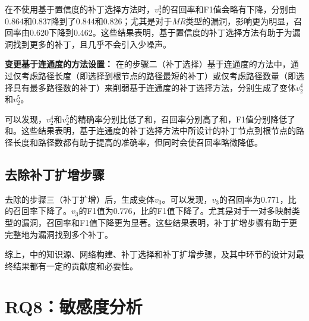 在不使用基于置信度的补丁选择方法时，$v_2^3$的召回率和F1值会略有下降，分别由0.864和0.837降到了0.844和0.826；尤其是对于\textit{MR}类型的漏洞，影响更为明显，召回率由0.620下降到0.462。这些结果表明，基于置信度的补丁选择方法有助于为漏洞找到更多的补丁，且几乎不会引入少噪声。


\textbf{变更基于连通度的方法设置：}
在\tool 的步骤二（补丁选择）基于连通度的方法中，通过仅考虑路径长度（即选择到根节点的路径最短的补丁）或仅考虑路径数量（即选择具有最多路径数的补丁）来削弱基于连通度的补丁选择方法，分别生成了变体$v_2^4$和$v_2^5$。

可以发现，$v_2^4$和$v_2^5$的精确率分别比\tool 低了和，召回率分别高了和，F1值分别降低了和。这些结果表明，基于连通度的补丁选择方法中所设计的补丁节点到根节点的路径长度和路径数都有助于提高\tool 的准确率，但同时会使召回率略微降低。

\subsection{去除补丁扩增步骤}
去除\tool 的步骤三（补丁扩增）后，生成变体$v_3$。可以发现，$v_3$的召回率为0.771，比\tool 的召回率下降了。$v_3$的F1值为0.776，比\tool 的F1值下降了。尤其是对于一对多映射类型的漏洞，召回率和F1值下降更为显著。这些结果表明，补丁扩增步骤有助于\tool 更完整地为漏洞找到多个补丁。

综上，\tool 中的知识源、网络构建、补丁选择和补丁扩增步骤，及其中环节的设计对最终结果都有一定的贡献度和必要性。


\section{RQ8：敏感度分析}\label{sec:sensitivity}

